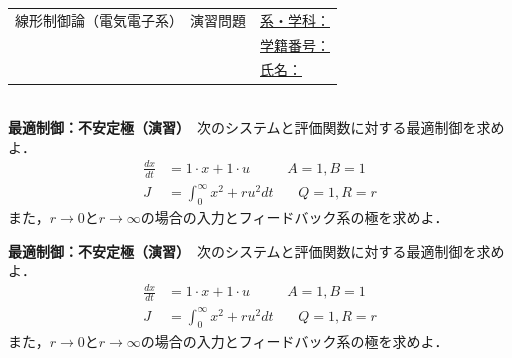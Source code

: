 \documentclass[a4paper,11pt]{jreport}
\begin{document}
\begin{tabular}{cl}
\hspace*{2cm}
{\large 線形制御論（電気電子系）　演習問題}
\hspace{1cm}
&
\underline{系・学科：\hspace{3cm}}
\\[2mm]
&\underline{学籍番号：\hspace{3cm}}
\\[2mm]
&\underline{氏名：\hspace{5cm}}
\end{tabular}
\ \\

\noindent
{\bf 最適制御：不安定極（演習）}　次のシステムと評価関数に対する最適制御を求めよ．
\begin{align*}
	\frac{dx}{dt} & = 1 \cdot x + 1 \cdot u \ \ \ \ \ \ \ \ \ \ \ \ A=1,B=1\\
	J & = \int_0^{\infty} x^2 + r u^2 dt \ \ \ \ \ \ \ \ Q=1,R=r
\end{align*}
また，$r\rightarrow 0$と$r\rightarrow \infty$の場合の入力とフィードバック系の極を求めよ．




\newpage

\noindent
{\bf 最適制御：不安定極（演習）}　次のシステムと評価関数に対する最適制御を求めよ．
\begin{align*}
	\frac{dx}{dt} & =1 \cdot x + 1 \cdot u \ \ \ \ \ \ \ \ \ \ \ \ A=1,B=1\\
	J & = \int_0^{\infty} x^2 + r u^2 dt \ \ \ \ \ \ \ \ Q=1,R=r
\end{align*}
また，$r\rightarrow 0$と$r\rightarrow \infty$の場合の入力とフィードバック系の極を求めよ．
\\
\end{document}
